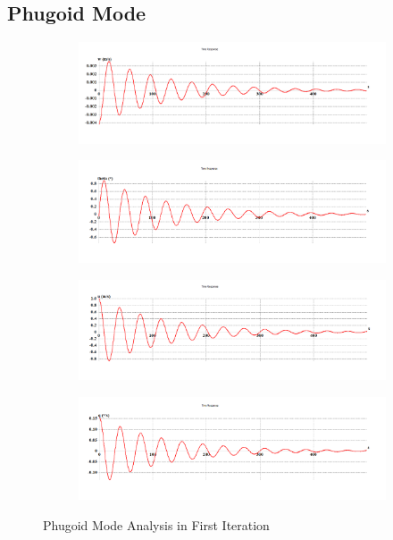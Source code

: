 \subsection{Phugoid Mode}
\begin{figure}[H]
\begin{subfigure}{0.48\textwidth}
\includegraphics[width = \linewidth]{w.png}
\end{subfigure}
\begin{subfigure}{0.48\textwidth}
\includegraphics[width = \linewidth]{theta.png}
\end{subfigure}
\medskip
\begin{subfigure}{0.48\textwidth}
\includegraphics[width = \linewidth]{u.png}
\end{subfigure}
\begin{subfigure}{0.48\textwidth}
\includegraphics[width = \linewidth]{q.png}
\end{subfigure}
\caption{Phugoid Mode Analysis in First Iteration}
\end{figure}
